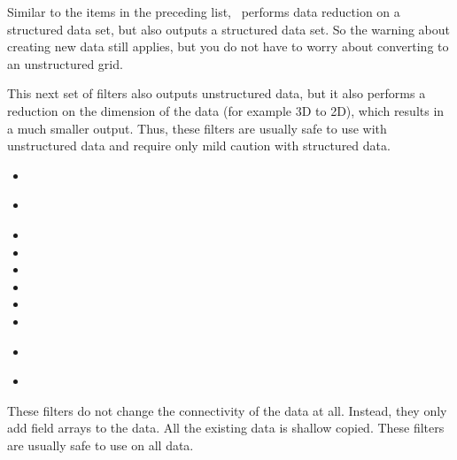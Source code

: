 Similar to the items in the preceding list, ~\extractSubset performs data
reduction on a structured data set, but also outputs a structured data set.
So the warning about creating new data still applies, but you do not have
to worry about converting to an unstructured grid.

This next set of filters also outputs unstructured data, but it also
performs a reduction on the dimension of the data (for example 3D to 2D),
which results in a much smaller output.  Thus, these filters are usually
safe to use with unstructured data and require only mild caution with
structured data.

\begin{multicols}{2}
  \begin{itemize}
  \item {}
  \item {}~\contour
  \item {}
  \item {}
  \item {}
  \item {}
  \item {}
  \item {}
  \item {}~\slice
  \item {}~\streamTracer
  \end{itemize}
\end{multicols}

These filters do not change the connectivity of the data at all.  Instead,
they only add field arrays to the data.  All the existing data is shallow
copied.  These filters are usually safe to use on all data.

